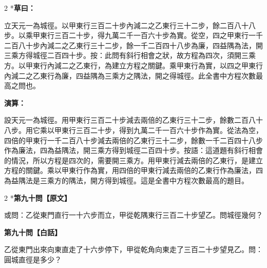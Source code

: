 \documentclass[11pt,a4paper]{article}
\begin{document}
\begin{paracol}{2}
\switchcolumn[0]*\textbf{草曰：}

\small 立天元一為城徑。以甲東行三百二十步內減二之乙東行三十二步，餘二百八十八步。以乘甲東行三百二十步，得九萬二千一百六十步為實。從空，四之甲東行一千二百八十步內減二之乙東行三十二步，餘一千二百四十八步為廉，四益隅為法，開三乘方得城徑二百四十步。按：此問有斜行相會之狀，故方程為四次，須開三乘方。以甲東行內減二之乙東行，為建立方程之關鍵。乘甲東行為實，以四之甲東行內減二之乙東行為廉，四益隅為三乘方之隅法，開之得城徑。此全書中方程次數最高之問也。

\switchcolumn\textbf{演算：}

\small 設天元一為城徑。用甲東行三百二十步減去兩倍的乙東行三十二步，餘數二百八十八步。用它乘以甲東行三百二十步，得到九萬二千一百六十步作為實。從法為空，四倍的甲東行一千二百八十步減去兩倍的乙東行三十二步，餘數一千二百四十八步作為廉法，四為益隅法，開三乘方得到城徑二百四十步。按語：這道題有斜行相會的情況，所以方程是四次的，需要開三乘方。用甲東行減去兩倍的乙東行，是建立方程的關鍵。乘以甲東行作為實，用四倍的甲東行減去兩倍的乙東行作為廉法，四為益隅法是三乘方的隅法，開方得到城徑。這是全書中方程次數最高的題目。
\end{paracol}

\vspace{0.1cm}
\noindent{}
\par\vspace{0.3cm}

\begin{paracol}{2}
\switchcolumn[0]*\noindent\textbf{第九十問【原文】}

\small 或問：乙從東門直行一十六步而立，甲從乾隅東行三百二十步望乙。問城徑幾何？

\switchcolumn\noindent\textbf{第九十問【白話】}

\small 乙從東門出來向東直走了十六步停下，甲從乾角向東走了三百二十步望見乙。問：圓城直徑是多少？
\end{paracol}

\vspace{0.1cm}
\noindent{}
\par\vspace{0.15cm}
\end{document}
